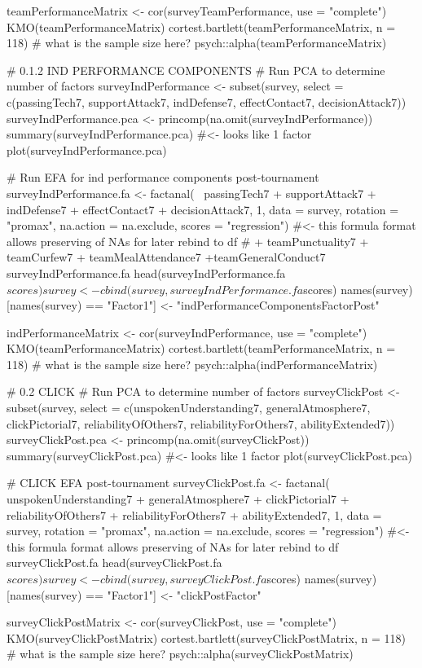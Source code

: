teamPerformanceMatrix <- cor(surveyTeamPerformance, use = "complete")
KMO(teamPerformanceMatrix)
cortest.bartlett(teamPerformanceMatrix, n = 118) # what is the sample size here?
psych::alpha(teamPerformanceMatrix)


# 0.1.2 IND PERFORMANCE COMPONENTS
# Run PCA to determine number of factors
surveyIndPerformance <- subset(survey, select = c(passingTech7, supportAttack7, indDefense7, effectContact7, decisionAttack7))
surveyIndPerformance.pca <- princomp(na.omit(surveyIndPerformance))
summary(surveyIndPerformance.pca)  #<- looks like 1 factor
plot(surveyIndPerformance.pca)


# Run EFA for ind performance components post-tournament
surveyIndPerformance.fa <- factanal(~ passingTech7 + supportAttack7 + indDefense7 + effectContact7 + decisionAttack7, 1,
                                     data = survey, rotation = "promax", na.action = na.exclude, scores = "regression")  #<- this formula format allows preserving of NAs for later rebind to df
# + teamPunctuality7 + teamCurfew7 + teamMealAttendance7 +teamGeneralConduct7
surveyIndPerformance.fa
head(surveyIndPerformance.fa$scores)
survey <- cbind(survey, surveyIndPerformance.fa$scores)
names(survey)[names(survey) == "Factor1"] <- "indPerformanceComponentsFactorPost"

indPerformanceMatrix <- cor(surveyIndPerformance, use = "complete")
KMO(teamPerformanceMatrix)
cortest.bartlett(teamPerformanceMatrix, n = 118) # what is the sample size here?
psych::alpha(indPerformanceMatrix)


# 0.2 CLICK
# Run PCA to determine number of factors
surveyClickPost <- subset(survey, select = c(unspokenUnderstanding7, generalAtmosphere7, clickPictorial7, reliabilityOfOthers7, reliabilityForOthers7, abilityExtended7))
surveyClickPost.pca <- princomp(na.omit(surveyClickPost))
summary(surveyClickPost.pca)  #<- looks like 1 factor
plot(surveyClickPost.pca)


# CLICK EFA post-tournament
surveyClickPost.fa <- factanal(~ unspokenUnderstanding7 + generalAtmosphere7 + clickPictorial7 + reliabilityOfOthers7 + reliabilityForOthers7 + abilityExtended7, 1,
                                    data = survey, rotation = "promax", na.action = na.exclude, scores = "regression")  #<- this formula format allows preserving of NAs for later rebind to df
surveyClickPost.fa
head(surveyClickPost.fa$scores)
survey <- cbind(survey, surveyClickPost.fa$scores)
names(survey)[names(survey) == "Factor1"] <- "clickPostFactor"

surveyClickPostMatrix <- cor(surveyClickPost, use = "complete")
KMO(surveyClickPostMatrix)
cortest.bartlett(surveyClickPostMatrix, n = 118) # what is the sample size here?
psych::alpha(surveyClickPostMatrix)

